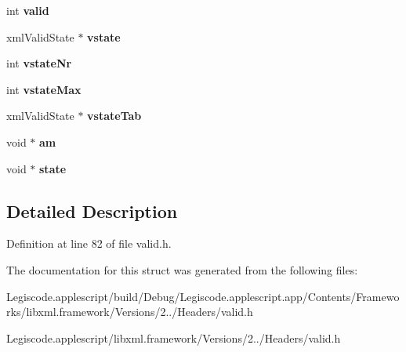 \begin{DoxyCompactItemize}
\item 
\hypertarget{struct__xml_valid_ctxt_ac31686aaeedb48c46b453f98c51597d2}{int {\bfseries valid}}\label{struct__xml_valid_ctxt_ac31686aaeedb48c46b453f98c51597d2}

\item 
\hypertarget{struct__xml_valid_ctxt_a505fa615ed796a0c19ae7aa138f59cdb}{xml\-Valid\-State $\ast$ {\bfseries vstate}}\label{struct__xml_valid_ctxt_a505fa615ed796a0c19ae7aa138f59cdb}

\item 
\hypertarget{struct__xml_valid_ctxt_af1d9fbfcf068c8dad6349fd677effc22}{int {\bfseries vstate\-Nr}}\label{struct__xml_valid_ctxt_af1d9fbfcf068c8dad6349fd677effc22}

\item 
\hypertarget{struct__xml_valid_ctxt_a606af121a4d33a9ec572147b17682125}{int {\bfseries vstate\-Max}}\label{struct__xml_valid_ctxt_a606af121a4d33a9ec572147b17682125}

\item 
\hypertarget{struct__xml_valid_ctxt_a91dd5e7865bb44737114e03a28bef3c2}{xml\-Valid\-State $\ast$ {\bfseries vstate\-Tab}}\label{struct__xml_valid_ctxt_a91dd5e7865bb44737114e03a28bef3c2}

\item 
\hypertarget{struct__xml_valid_ctxt_aa848a928c3edf586854a75e830700b83}{void $\ast$ {\bfseries am}}\label{struct__xml_valid_ctxt_aa848a928c3edf586854a75e830700b83}

\item 
\hypertarget{struct__xml_valid_ctxt_a1ddb6b8a2e152af3d6dbe5e5eb9e07d2}{void $\ast$ {\bfseries state}}\label{struct__xml_valid_ctxt_a1ddb6b8a2e152af3d6dbe5e5eb9e07d2}

\end{DoxyCompactItemize}


\subsection{Detailed Description}


Definition at line 82 of file valid.\-h.



The documentation for this struct was generated from the following files\-:\begin{DoxyCompactItemize}
\item 
Legiscode.\-applescript/build/\-Debug/\-Legiscode.\-applescript.\-app/\-Contents/\-Frameworks/libxml.\-framework/\-Versions/2../\-Headers/valid.\-h\item 
Legiscode.\-applescript/libxml.\-framework/\-Versions/2../\-Headers/valid.\-h\end{DoxyCompactItemize}
